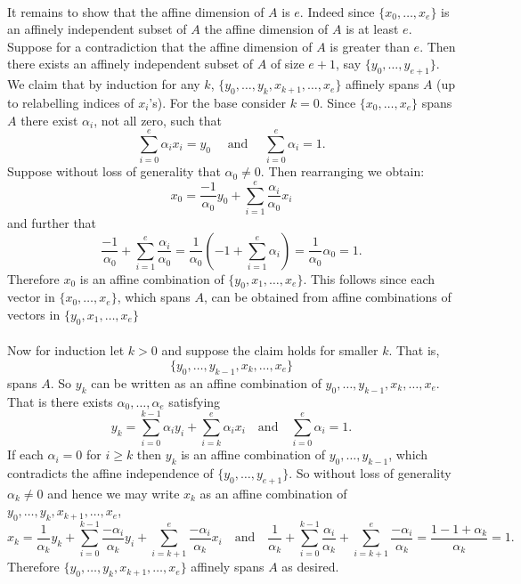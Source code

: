 \documentclass[letterpaper,12pt,oneside,onecolumn]{article}
\begin{document}
\paragraph{}
It remains to show that the affine dimension of $A$ is $e$. Indeed since $\{x_0, \dots, x_e\}$ is an affinely independent subset of $A$ the affine dimension of $A$ is at least $e$. Suppose for a contradiction that the affine dimension of $A$ is greater than $e$. Then there exists an affinely independent subset of $A$ of size $e+1$, say $\{y_0, \dots, y_{e+1}\}$. We claim that by induction for any $k$, $\{y_0, \dots, y_k, x_{k+1}, \dots, x_e\}$ affinely spans $A$ (up to relabelling indices of $x_i$'s). For the base consider $k=0$. Since $\{x_0, \dots, x_e\}$ spans $A$ there exist $\alpha_i$, not all zero, such that $$\sum_{i=0}^e \alpha_i x_i = y_0 \quad\text{ and }\quad \sum_{i=0}^e \alpha_i = 1.$$
Suppose without loss of generality that $\alpha_0 \neq 0$. Then rearranging we obtain:
$$x_0 = \frac{-1}{\alpha_0}y_0 + \sum_{i=1}^e \frac{\alpha_i}{\alpha_0} x_i$$
and further that
$$\frac{-1}{\alpha_0} + \sum_{i=1}^e \frac{\alpha_i}{\alpha_0} = \frac{1}{\alpha_0}(-1+\sum_{i=1}^e \alpha_i) = \frac{1}{\alpha_0}\alpha_0 = 1.$$
Therefore $x_0$ is an affine combination of $\{y_0, x_1, \dots, x_e\}$. This follows since each vector in $\{x_0, \dots, x_e\}$, which spans $A$, can be obtained from affine combinations of vectors in $\{y_0, x_1, \dots, x_e\}$ 
\paragraph{}
Now for induction let $k>0$ and suppose the claim holds for smaller $k$. That is, $$\{y_0, \dots, y_{k-1}, x_k, \dots, x_e\}$$ spans $A$. So $y_k$ can be written as an affine combination of $y_0, \dots, y_{k-1}, x_k, \dots, x_e$. That is there exists $\alpha_0, \dots, \alpha_e$ satisfying
$$ y_k = \sum_{i=0}^{k-1} \alpha_iy_i + \sum_{i=k}^e \alpha_ix_i \quad \text{and}\quad \sum_{i=0}^e \alpha_i=1.$$
If each $\alpha_i = 0$ for $i \geq k$ then $y_k$ is an affine combination of $y_0, \dots, y_{k-1}$, which contradicts the affine independence of $\{y_0, \dots, y_{e+1}\}$. So without loss of generality $\alpha_k \neq 0$ and hence we may write $x_k$ as an affine combination of $y_0, \dots, y_k, x_{k+1}, \dots, x_e$,
$$x_k = \frac{1}{\alpha_k}y_k+\sum_{i=0}^{k-1} \frac{-\alpha_{i}}{\alpha_k}y_i + \sum_{i=k+1}^e \frac{-\alpha_i}{\alpha_k}x_i \quad\text{and}\quad \frac{1}{\alpha_k} + \sum_{i=0}^{k-1} \frac{\alpha_i}{\alpha_k} + \sum_{i=k+1}^e \frac{-\alpha_i}{\alpha_k} = \frac{1 - 1 +\alpha_k}{\alpha_k} = 1.$$
Therefore $\{y_0, \dots, y_k, x_{k+1}, \dots, x_e\}$ affinely spans $A$ as desired.
\end{document}
